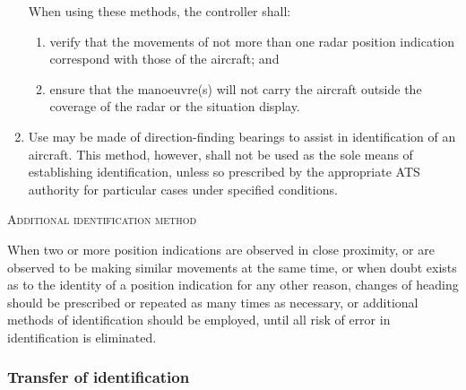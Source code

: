 \documentclass[../vATM.tex]{subfiles}
\begin{document}
\begin{enumeratesc}
\begin{enumerate}
\begin{enumalph}
    			\noindent When using these methods, the controller shall:
    			
    			\begin{enumerate}[label=\roman*),labelsep=0pt,leftmargin=*,labelindent=0pt]
    				\item verify that the movements of not more than one radar position indication correspond with those of the aircraft; and
    				\item ensure that the manoeuvre(s) will not carry the aircraft outside the coverage of the radar or the situation display.
    			\end{enumerate}
    		
    		\end{enumalph}
    	
    		\item Use may be made of direction-finding bearings to assist in identification of an aircraft. This method, however, shall not be used as the sole means of establishing identification, unless so prescribed by the appropriate ATS authority for particular cases under specified conditions.
    	\end{enumerate}
    
    	\item \textsc{Additional identification method}
    	\begin{enumempty}
    		\item When two or more position indications are observed in close proximity, or are observed to be making similar movements at the same time, or when doubt exists as to the identity of a position indication for any other reason, changes of heading should be prescribed or repeated as many times as necessary, or additional methods of identification should be employed, until all risk of error in identification is eliminated.
    	\end{enumempty}    
    \end{enumeratesc}

    \subsubsection{Transfer of identification}
\end{document}
